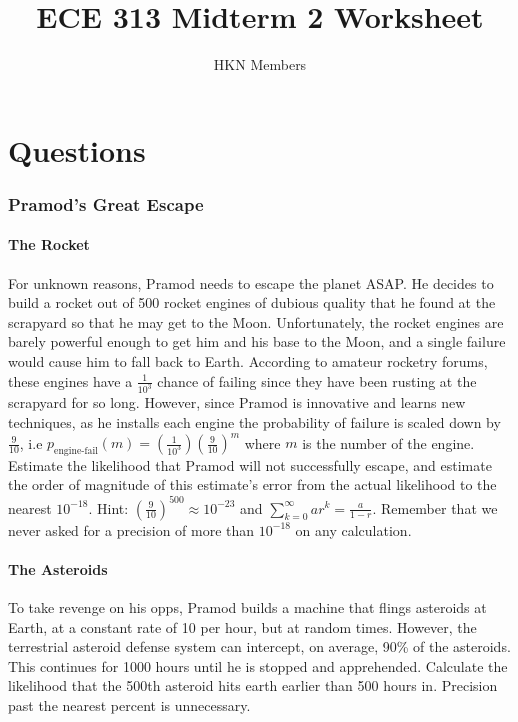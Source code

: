 \documentclass{exam}
\title{ECE 313 Midterm 2 Worksheet}
\author{HKN Members}
\date{}
\begin{document}
\maketitle
\part*{Questions}
\section{Pramod's Great Escape}
\subsection{The Rocket}
For unknown reasons, Pramod needs to escape the planet ASAP. He decides to build a rocket out of 500 rocket engines of dubious quality that he found at the scrapyard so that he may get to the Moon. Unfortunately, the rocket engines are barely powerful enough to get him and his base to the Moon, and a single failure would cause him to fall back to Earth. According to amateur rocketry forums, these engines have a $\frac{1}{10^3}$ chance of failing since they have been rusting at the scrapyard for so long. However, since Pramod is innovative and learns new techniques, as he installs each engine the probability of failure is scaled down by $\frac{9}{10}$, i.e $p_{\text{engine-fail}}(m) = (\frac{1}{10^3})(\frac{9}{10})^m$ where $m$ is the number of the engine. Estimate the likelihood that Pramod will not successfully escape, and estimate the order of magnitude of this estimate's error from the actual likelihood to the nearest $10^{-18}$. 
\newline
\newline
Hint: $(\frac{9}{10})^{500} \approx 10^{-23}$ and $\sum_{k=0}^{\infty} ar^k = \frac{a}{1-r}$. Remember that we never asked for a precision of more than $10^{-18}$ on any calculation. 
\vspace{5cm}

\subsection{The Asteroids}
To take revenge on his opps, Pramod builds a machine that flings asteroids at Earth, at a constant rate of 10 per hour, but at random times. However, the terrestrial asteroid defense system can intercept, on average, 90\% of the asteroids. This continues for 1000 hours until he is stopped and apprehended. Calculate the likelihood that the 500th asteroid hits earth earlier than 500 hours in. Precision past the nearest percent is unnecessary. 
\vspace{5cm}
\end{document}
